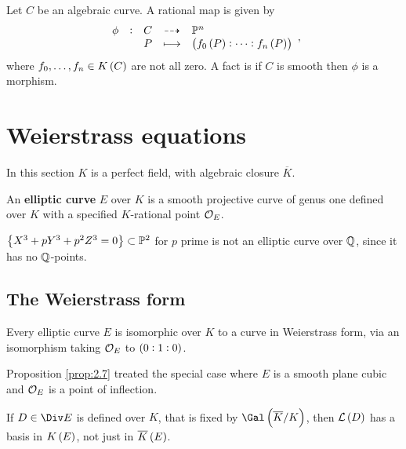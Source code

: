\begin{remark}
\label{rem:2.9}
Let $ C $ be an algebraic curve. A rational map is given by
$$ \rational[\phi]{C}{\PP^n}{P}{\br{f_0\br{P} : \dots : f_n\br{P}}}, $$
where $ f_0, \dots, f_n \in K\br{C} $ are not all zero. A fact is if $ C $ is smooth then $ \phi $ is a morphism.
\end{remark}

\pagebreak

\section{Weierstrass equations}

In this section $ K $ is a perfect field, with algebraic closure $ \overline{K} $.

\begin{definition*}
An \textbf{elliptic curve} $ E $ over $ K $ is a smooth projective curve of genus one defined over $ K $ with a specified $ K $-rational point $ \mathcal{O}_E $.
\end{definition*}

\begin{example*}
$ \cbr{X^3 + pY^3 + p^2Z^3 = 0} \subset \PP^2 $ for $ p $ prime is not an elliptic curve over $ \mathbb{Q} $, since it has no $ \mathbb{Q} $-points.
\end{example*}

\subsection{The Weierstrass form}

\begin{theorem}
\label{thm:3.1}
Every elliptic curve $ E $ is isomorphic over $ K $ to a curve in Weierstrass form, via an isomorphism taking $ \mathcal{O}_E $ to $ \br{0 : 1 : 0} $.
\end{theorem}

\begin{remark*}
Proposition \ref{prop:2.7} treated the special case where $ E $ is a smooth plane cubic and $ \mathcal{O}_E $ is a point of inflection.
\end{remark*}

\begin{fact*}
If $ D \in \Div E $ is defined over $ K $, that is fixed by $ \Gal\br{\overline{K} / K} $, then $ \LLL\br{D} $ has a basis in $ K\br{E} $, not just in $ \overline{K}\br{E} $.
\end{fact*}

